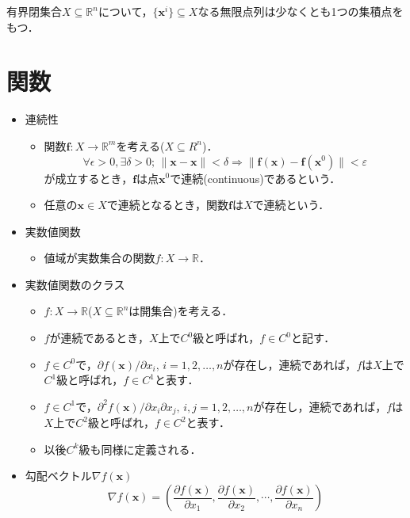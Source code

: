 \documentclass{jsreport}
\begin{document}
有界閉集合$X \subseteq \mathbb{R}^n$について，$\{\bm{x}^i\} \subseteq X$なる無限点列は少なくとも1つの集積点をもつ．

\section{関数}
\begin{itemize}
  \item 連続性
  \begin{itemize}
    \item 関数$\bm{f}: X \rightarrow \mathbb{R}^m$を考える($X \subseteq R^n$)．
    \begin{equation}
      \forall \epsilon > 0, \exists \delta > 0; \, \|\bm{x} - \bm{x}\| < \delta \Rightarrow \|\bm{f}(\bm{x}) - \bm{f}(\bm{x}^0) \| < \varepsilon \nonumber
    \end{equation}
    が成立するとき，$\bm{f}$は点$\bm{x}^0$で連続(continuous)であるという．
    \item 任意の$\bm{x} \in X$で連続となるとき，関数$\bm{f}$は$X$で連続という．
  \end{itemize}
  \item 実数値関数
  \begin{itemize}
    \item 値域が実数集合の関数$f: X \rightarrow \mathbb{R}$．
  \end{itemize}
  \item 実数値関数のクラス
  \begin{itemize}
    \item $f: X \rightarrow \mathbb{R}$($X \subseteq \mathbb{R}^n$は開集合)を考える．
    \item $f$が連続であるとき，$X$上で$C^0$級と呼ばれ，$f \in C^0$と記す．
    \item $f \in C^0$で，$\partial f(\bm{x}) / \partial x_i, \, i = 1, 2, \ldots, n$が存在し，連続であれば，$f$は$X$上で$C^1$級と呼ばれ，$f \in C^1$と表す．
    \item $f \in C^1$で，$\partial^2 f(\bm{x}) / \partial x_i \partial x_j, \, i,j = 1, 2, \ldots, n$が存在し，連続であれば，$f$は$X$上で$C^2$級と呼ばれ，$f \in C^2$と表す．
    \item 以後$C^k$級も同様に定義される．
  \end{itemize}
  \item 勾配ベクトル$\nabla f(\bm{x})$
    \begin{equation}
      \nabla f(\bm{x}) = \left(\frac{\partial f(\bm{x})}{\partial x_1}, \frac{\partial f(\bm{x})}{\partial x_2}, \cdots, \frac{\partial f(\bm{x})}{\partial x_n}\right) \nonumber

\end{equation}
\end{itemize}
\end{document}
